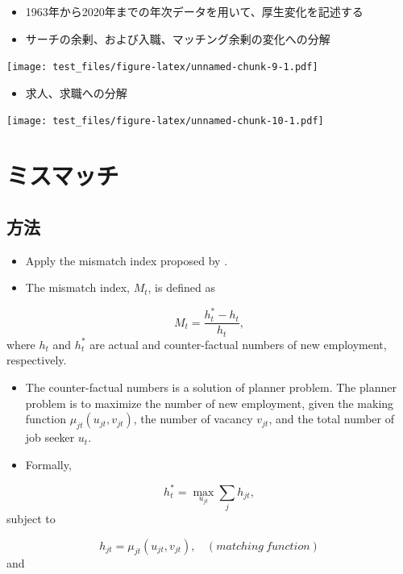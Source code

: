 \documentclass[
]{book}
\providecommand{\tightlist}{%
  \setlength{\itemsep}{0pt}\setlength{\parskip}{0pt}}
\begin{document}
\begin{itemize}
\item
  1963年から2020年までの年次データを用いて、厚生変化を記述する
\item
  サーチの余剰、および入職、マッチング余剰の変化への分解
\end{itemize}

\texttt{[image: test\_files/figure-latex/unnamed-chunk-9-1.pdf]}

\begin{itemize}
\tightlist
\item
  求人、求職への分解
\end{itemize}

\texttt{[image: test\_files/figure-latex/unnamed-chunk-10-1.pdf]}

\hypertarget{ux30dfux30b9ux30deux30c3ux30c1}{%
\chapter{ミスマッチ}\label{ux30dfux30b9ux30deux30c3ux30c1}}

\hypertarget{ux65b9ux6cd5-1}{%
\section{方法}\label{ux65b9ux6cd5-1}}

\begin{itemize}
\item
  Apply the mismatch index proposed by \citet{csahin2014mismatch}.
\item
  The mismatch index, \(M_t\), is defined as
\end{itemize}

\[M_t = \frac{h_t^{*}-h_t}{h_t},\]
where \(h_t\) and \(h_t^*\) are actual and counter-factual numbers of new employment, respectively.

\begin{itemize}
\item
  The counter-factual numbers is a solution of planner problem.
  The planner problem is to maximize the number of new employment, given the making function \(\mu_{jt}(u_{jt},v_{jt})\), the number of vacancy \(v_{jt}\), and the total number of job seeker \(u_{t}\).
\item
  Formally,
\end{itemize}

\[h_t^*=\max_{u_{jt}} \sum_j h_{jt},\]
subject to

\[h_{jt}=\mu_{jt}(u_{jt},v_{jt}),\ \ \ \ (matching\ function)\]
and
\end{document}
